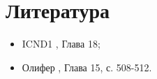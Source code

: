 \section{Литература}
\begin{itemize}
	\item ICND1 \cite{icnd1eng}, Глава 18;
	\item Олифер \cite{olipher}, Глава 15, с. 508-512.
\end{itemize}